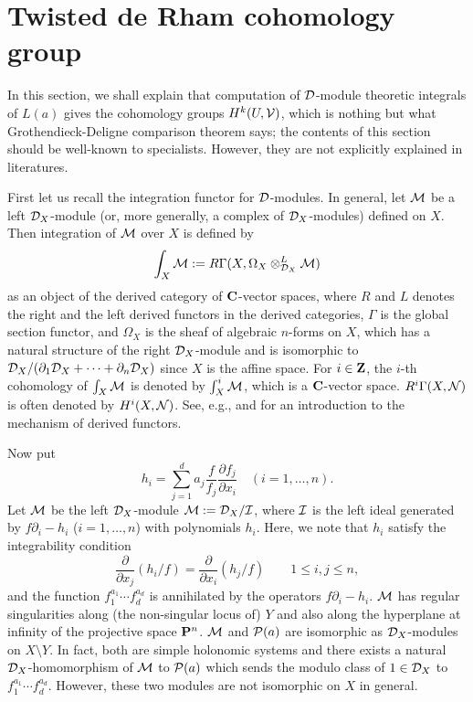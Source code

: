 \documentclass[12pt]{article}
\def\pd#1{ \partial_{#1} }
\def\C{{\bf C}}
\def\Z{ {\bf Z} }
\def\Dsc{ {\cal D} }
\def\Isc{ {\cal I} }
\def\Msc{ {\cal M} }
\def\Nsc{ {\cal N} }
\def\Psc{ {\cal P} }
\begin{document}
\section{Twisted de Rham cohomology group}
\label{deRhamCohomologyAndIntegrationOfDmodules}
\setcounter{equation}{0}

In this section, we shall explain that computation of $\Dsc$-module
theoretic integrals  of
$L(a)$ gives the cohomology groups 
$H^k(U,{\cal V})$,
which is nothing but what Grothendieck-Deligne comparison 
theorem says;
the contents of this section should be well-known to specialists.
However, they are not explicitly explained in literatures.

First let us recall the integration functor for $\Dsc$-modules.
In general, let $\Msc$ be a left $\Dsc_X$-module 
(or, more generally, a complex of $\Dsc_X$-modules) defined on $X$.
Then integration of $\Msc$ over $X$ is defined by
$$
\int_X \Msc := R\Gamma(X, \Omega_X\otimes_{\Dsc_X}^{L}\Msc)
$$
as an object of the derived category of $\C$-vector spaces, 
where $R$ and $L$ denotes the right and the left derived functors in 
the derived categories, $\Gamma$ is the global section functor,
 and $\Omega_X$ is the sheaf of algebraic 
$n$-forms on $X$, which has a natural structure of the right $\Dsc_X$-module
and is isomorphic to
$\Dsc_X/ (\pd{1} \Dsc_X + \cdots + \pd{n} \Dsc_X)$  
since $X$ is the affine space. 
For $i\in \Z$, the $i$-th cohomology of $\int_X\Msc$ is denoted by 
$\int_X^i\Msc$, which is a $\C$-vector space.  
$R^i\Gamma(X,\Nsc)$ is often denoted by $H^i(X,\Nsc)$.
See, e.g.,  \cite{EisenbudBook} and \cite{HartshornBook}
for an introduction to the mechanism of derived functors.

Now put
$$
h_i = \sum_{j=1}^d a_j\frac{f}{f_j}\frac{\partial f_j}{\partial x_i}
\quad (i = 1,\dots,n).
$$
Let 
$\Msc$ be the left $\Dsc_X$-module $\Msc := \Dsc_X/\Isc$, where
$\Isc$ is the left ideal generated by 
$f\partial_i-h_i$ ($i=1,\dots,n$) with polynomials $h_i$.
Here, we note that $h_i$ satisfy the
integrability condition
\begin{equation}
\frac{\partial}{\partial x_j}(h_i/f) =
\frac{\partial}{\partial x_i}(h_j/f)
\qquad 1 \leq i,j \leq n,
\end{equation}
and the function $f_1^{a_1} \cdots f_d^{a_d}$ is annihilated 
by the operators $f \pd{i} - h_i$.
$\Msc$ has regular singularities along 
(the non-singular locus of) $Y$ and also along 
the hyperplane at infinity of the projective space ${\bf P}^n$. 
$\Msc$  and $\Psc(a)$ are isomorphic as $\Dsc_X$-modules 
on $X\setminus Y$.  In fact, both are simple holonomic systems 
and there exists a natural $\Dsc_X$-homomorphism of $\Msc$ to $\Psc(a)$ 
which sends the modulo class of $1 \in \Dsc_X$ to 
$f_1^{a_1}\cdots f_d^{a_d}$.  
However, these two modules are not isomorphic on $X$ in general.
\end{document}
